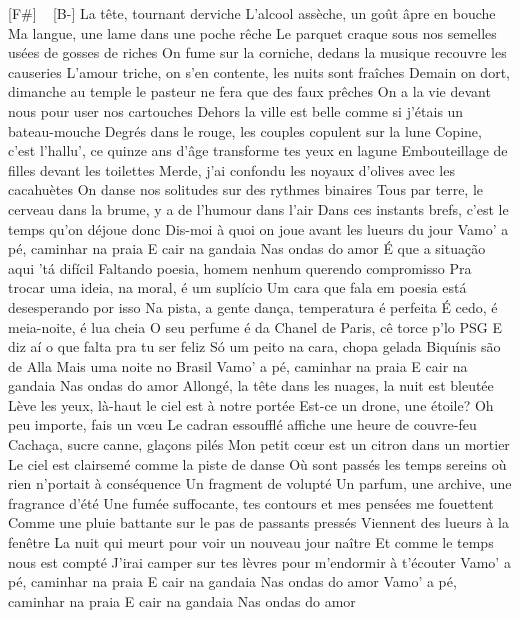 [F#] ~ [B-]
La tête, tournant derviche
L'alcool assèche, un goût âpre en bouche
Ma langue, une lame dans une poche rêche
Le parquet craque sous nos semelles usées de gosses de riches
On fume sur la corniche, dedans la musique recouvre les causeries
L'amour triche, on s'en contente, les nuits sont fraîches
Demain on dort, dimanche au temple le pasteur ne fera que des faux prêches
On a la vie devant nous pour user nos cartouches
Dehors la ville est belle comme si j'étais un bateau-mouche
Degrés dans le rouge, les couples copulent sur la lune
Copine, c'est l'hallu', ce quinze ans d'âge transforme tes yeux en lagune
Embouteillage de filles devant les toilettes
Merde, j'ai confondu les noyaux d'olives avec les cacahuètes
On danse nos solitudes sur des rythmes binaires
Tous par terre, le cerveau dans la brume, y a de l'humour dans l'air
Dans ces instants brefs, c'est le temps qu'on déjoue donc
Dis-moi à quoi on joue avant les lueurs du jour
Vamo' a pé, caminhar na praia
E cair na gandaia
Nas ondas do amor
É que a situação aqui 'tá difícil
Faltando poesia, homem nenhum querendo compromisso
Pra trocar uma ideia, na moral, é um suplício
Um cara que fala em poesia está desesperando por isso
Na pista, a gente dança, temperatura é perfeita
É cedo, é meia-noite, é lua cheia
O seu perfume é da Chanel de Paris, cê torce p'lo PSG
E diz aí o que falta pra tu ser feliz
Só um peito na cara, chopa gelada
Biquínis são de Alla
Mais uma noite no Brasil
Vamo' a pé, caminhar na praia
E cair na gandaia
Nas ondas do amor
Allongé, la tête dans les nuages, la nuit est bleutée
Lève les yeux, là-haut le ciel est à notre portée
Est-ce un drone, une étoile? Oh peu importe, fais un vœu
Le cadran essoufflé affiche une heure de couvre-feu
Cachaça, sucre canne, glaçons pilés
Mon petit cœur est un citron dans un mortier
Le ciel est clairsemé comme la piste de danse
Où sont passés les temps sereins où rien n'portait à conséquence
Un fragment de volupté
Un parfum, une archive, une fragrance d'été
Une fumée suffocante, tes contours et mes pensées me fouettent
Comme une pluie battante sur le pas de passants pressés
Viennent des lueurs à la fenêtre
La nuit qui meurt pour voir un nouveau jour naître
Et comme le temps nous est compté
J'irai camper sur tes lèvres pour m'endormir à t'écouter
Vamo' a pé, caminhar na praia
E cair na gandaia
Nas ondas do amor
Vamo' a pé, caminhar na praia
E cair na gandaia
Nas ondas do amor